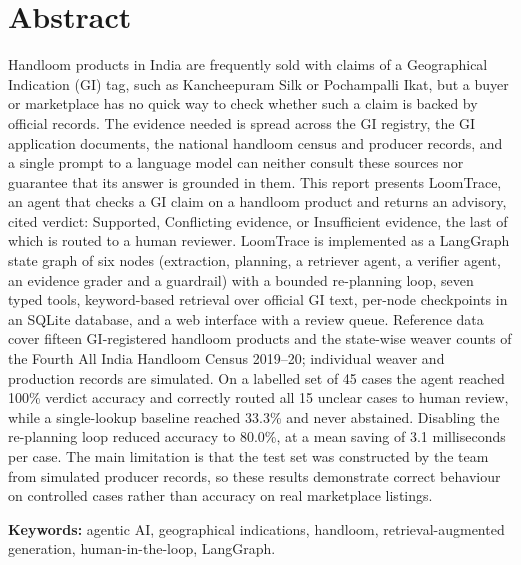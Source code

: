 \documentclass[12pt,a4paper,oneside]{report}
\begin{document}
\chapter*{Abstract}
\thispagestyle{frontmatter}
Handloom products in India are frequently sold with claims of a Geographical Indication (GI) tag,
such as Kancheepuram Silk or Pochampalli Ikat, but a buyer or marketplace has no quick way to check
whether such a claim is backed by official records. The evidence needed is spread across the GI
registry, the GI application documents, the national handloom census and producer records, and a
single prompt to a language model can neither consult these sources nor guarantee that its answer is
grounded in them. This report presents LoomTrace, an agent that checks a GI claim on a handloom product
and returns an advisory, cited verdict: Supported, Conflicting evidence, or Insufficient evidence, the
last of which is routed to a human reviewer. LoomTrace is implemented as a LangGraph state graph of six
nodes (extraction, planning, a retriever agent, a verifier agent, an evidence grader and a guardrail)
with a bounded re-planning loop, seven typed tools, keyword-based retrieval over official GI text,
per-node checkpoints in an SQLite database, and a web interface with a review queue. Reference data
cover fifteen GI-registered handloom products and the state-wise weaver counts of the Fourth All India
Handloom Census 2019--20; individual weaver and production records are simulated. On a labelled set of
45 cases the agent reached 100\% verdict accuracy and correctly routed all 15 unclear cases to human
review, while a single-lookup baseline reached 33.3\% and never abstained. Disabling the re-planning
loop reduced accuracy to 80.0\%, at a mean saving of 3.1 milliseconds per case. The main limitation is
that the test set was constructed by the team from simulated producer records, so these results
demonstrate correct behaviour on controlled cases rather than accuracy on real marketplace listings.

\medskip
\noindent\textbf{Keywords:} agentic AI, geographical indications, handloom, retrieval-augmented
generation, human-in-the-loop, LangGraph.

\tableofcontents
\listoffigures
{}
\listoftables
{}
\end{document}
